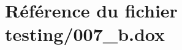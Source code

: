 \hypertarget{007__b_8dox}{}\section{Référence du fichier testing/007\+\_\+b.dox}
\label{007__b_8dox}
